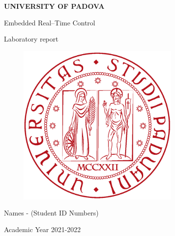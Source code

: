 \documentclass[english]{article}
\begin{document}
\begin{titlepage}

	\begin{center}
		\begin{Large} \textbf{UNIVERSITY OF PADOVA} \\
		\end{Large} \vspace{1cm}
		\vspace{3cm}
		\begin{Large} Embedded Real--Time Control \end{Large}
		\par\end{center}

	\begin{center}
		\begin{Large}Laboratory report\\
		\end{Large}
		\par\end{center}

	\begin{center}
		\vspace{2cm}
		\begin{figure}[!htb]
			\centering \includegraphics[width=8cm]{figures/unipd-logo.png}\\

		\end{figure}

		\par\end{center}

	\begin{center}
		\vspace{2cm}
		\begin{Large} Names - (Student ID Numbers)  \\
		\end{Large} \vspace{2cm}
		\begin{Large} Academic Year 2021-2022 \end{Large}
		\par\end{center}

\end{titlepage}
\end{document}
